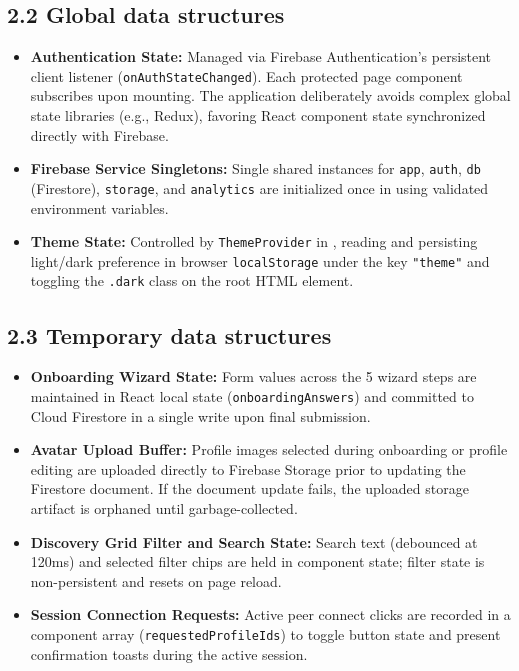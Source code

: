 \documentclass[11pt,letterpaper]{article}
\begin{document}
\subsection*{2.2 Global data structures}

\begin{itemize}[leftmargin=*,itemsep=3pt]
\item \textbf{Authentication State:} Managed via Firebase Authentication's persistent client listener (\texttt{onAuthState}\allowbreak\texttt{Changed}). Each protected page component subscribes upon mounting. The application deliberately avoids complex global state libraries (e.g., Redux), favoring React component state synchronized directly with Firebase.
\item \textbf{Firebase Service Singletons:} Single shared instances for \texttt{app}, \texttt{auth}, \texttt{db} (Firestore), \texttt{storage}, and \texttt{analytics} are initialized once in  using validated environment variables.
\item \textbf{Theme State:} Controlled by \texttt{ThemeProvider} in , reading and persisting light/dark preference in browser \texttt{localStorage} under the key \texttt{"theme"} and toggling the \texttt{.dark} class on the root HTML element.
\end{itemize}

\subsection*{2.3 Temporary data structures}

\begin{itemize}[leftmargin=*,itemsep=3pt]
\item \textbf{Onboarding Wizard State:} Form values across the 5 wizard steps are maintained in React local state (\texttt{onboardingAnswers}) and committed to Cloud Firestore in a single write upon final submission.
\item \textbf{Avatar Upload Buffer:} Profile images selected during onboarding or profile editing are uploaded directly to Firebase Storage prior to updating the Firestore document. If the document update fails, the uploaded storage artifact is orphaned until garbage-collected.
\item \textbf{Discovery Grid Filter and Search State:} Search text (debounced at 120ms) and selected filter chips are held in component state; filter state is non-persistent and resets on page reload.
\item \textbf{Session Connection Requests:} Active peer connect clicks are recorded in a component array (\texttt{requestedProfileIds}) to toggle button state and present confirmation toasts during the active session.
\end{itemize}
\end{document}
